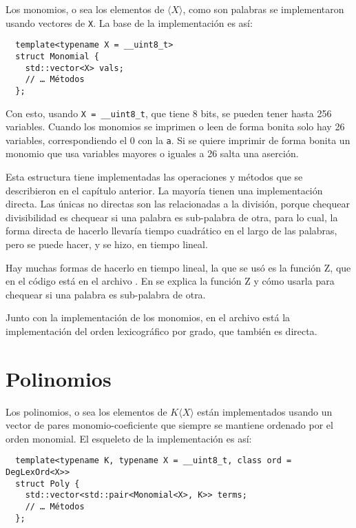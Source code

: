 \documentclass[12pt]{report}
\theoremstyle{customstyle}
\theoremstyle{factstyle}
\begin{document}
Los monomios, o sea los elementos de $⟨X⟩$, como son palabras se implementaron usando vectores de \texttt{X}. La base de la implementación es así:

\begin{verbatim}
  template<typename X = __uint8_t>
  struct Monomial {
    std::vector<X> vals;
    // … Métodos
  };
\end{verbatim}

Con esto, usando \texttt{X = \_\_uint8\_t}, que tiene 8 bits, se pueden tener hasta 256 variables. Cuando los monomios se imprimen o leen de forma bonita solo hay 26 variables, correspondiendo el 0 con la \texttt{a}. Si se quiere imprimir de forma bonita un monomio que usa variables mayores o iguales a 26 salta una aserción.

Esta estructura tiene implementadas las operaciones y métodos que se describieron en el capítulo anterior. La mayoría tienen una implementación directa. Las únicas no directas son las relacionadas a la división, porque chequear divisibilidad es chequear si una palabra es sub-palabra de otra, para lo cual, la forma directa de hacerlo llevaría tiempo cuadrático en el largo de las palabras, pero se puede hacer, y se hizo, en tiempo lineal.

Hay muchas formas de hacerlo en tiempo lineal, la que se usó es la función Z, que en el código está en el archivo . En \cite{web:cp-algo:Zfunc} se explica la función Z y cómo usarla para chequear si una palabra es sub-palabra de otra.

Junto con la implementación de los monomios, en el archivo  está la implementación del orden lexicográfico por grado, que también es directa.

\section{Polinomios}

Los polinomios, o sea los elementos de $K⟨X⟩$ están implementados usando un vector de pares monomio-coeficiente que siempre se mantiene ordenado por el orden monomial. El esqueleto de la implementación es así:

\begin{verbatim}
  template<typename K, typename X = __uint8_t, class ord = DegLexOrd<X>>
  struct Poly {
    std::vector<std::pair<Monomial<X>, K>> terms;
    // … Métodos
  };
\end{verbatim}
\end{document}
